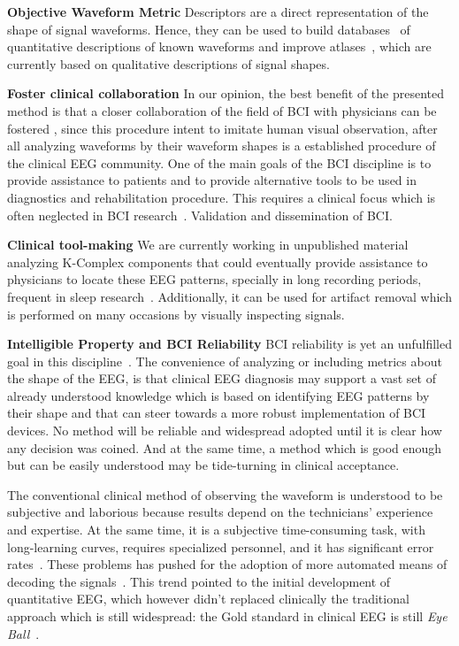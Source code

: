 \textbf{Objective Waveform Metric}
Descriptors are a direct representation of the shape of signal waveforms. Hence,  they can be used to build databases~\cite{Chavarriaga2017} of quantitative descriptions of known waveforms and improve atlases~\cite{Hartman2005}, which are currently based on qualitative descriptions of signal shapes.

\textbf{Foster clinical collaboration}
In our opinion, the best benefit of the presented method is that a closer collaboration of the field of BCI with physicians can be fostered \cite{Chavarriaga2017}, since this procedure intent to imitate human visual observation, after all analyzing waveforms by their waveform shapes is a established procedure of the clinical EEG community. One of the main goals of the BCI discipline is to provide assistance to patients and to provide alternative tools to be used in diagnostics and rehabilitation procedure.  This requires a clinical focus which is often neglected in BCI research~\cite{Chavarriaga2017}.  Validation and dissemination of BCI.

\textbf{Clinical tool-making}
We are currently working in unpublished material analyzing K-Complex components that could eventually provide  assistance to physicians to locate these EEG patterns, specially in long recording periods, frequent in sleep research~\cite{Michel2012}.  %
Additionally, it can be used for artifact removal which is performed on many occasions by visually inspecting signals. 


\textbf{Intelligible Property and BCI Reliability}
BCI reliability is yet an unfulfilled goal in this discipline~\cite{WolpawJonathanR2012}. The convenience of analyzing or including metrics about the shape of the EEG, is that clinical EEG diagnosis may support a vast set of already understood knowledge which is based on identifying EEG patterns by their shape and that can steer towards a more robust implementation of BCI devices.  No method will be reliable and widespread adopted until it is clear how any decision was coined. And at the same time, a method which is good enough but can be easily understood may be tide-turning in clinical acceptance.

The conventional clinical method of observing the waveform is understood to be subjective and laborious because results depend on the technicians' experience and expertise.   At the same time, it is a subjective time-consuming task, with long-learning curves, requires specialized personnel, and it has significant error rates~\cite{Tjepkema-Cloostermans2018}.  These problems has pushed for the adoption of more automated means of decoding the signals~\cite{Thakor2004}.   This trend pointed to the initial development of quantitative EEG, which however didn't replaced clinically the traditional approach which is still widespread: the Gold standard in clinical EEG is still \textit{Eye Ball}~\cite{Wulsin2011,Tjepkema-Cloostermans2018}.  

